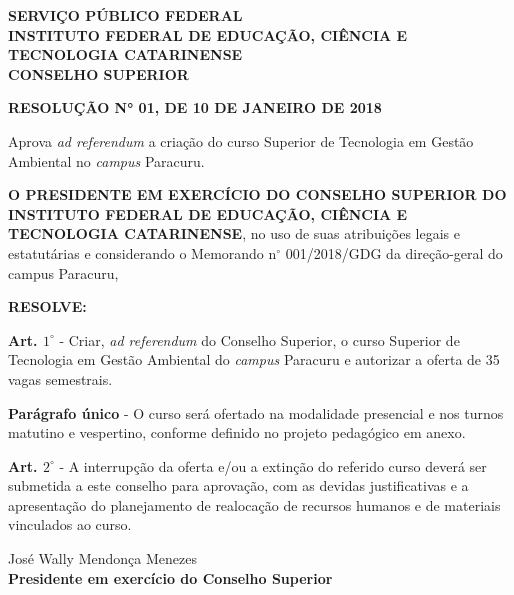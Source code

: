 
\begin{center}
\begin{figure}[!ht]
\centering
\end{figure}
\vspace*{-0.8cm}
\textbf{
SERVIÇO PÚBLICO FEDERAL \\
INSTITUTO FEDERAL DE EDUCAÇÃO, CIÊNCIA E TECNOLOGIA CATARINENSE \\
CONSELHO SUPERIOR
}
\end{center}

\begin{center}
\textbf{RESOLUÇÃO N° 01, DE 10 DE JANEIRO DE 2018}
\end{center}

\vspace*{-1cm}

\begin{SingleSpace}
\begin{flushright}
\begin{minipage}[b]{8cm}
\begin{small}
Aprova \textit{ad referendum} a criação do curso Superior de Tecnologia em Gestão Ambiental no \textit{campus} Paracuru. 
\end{small}
\end{minipage}
\end{flushright}
\end{SingleSpace}

\textbf{O PRESIDENTE EM EXERCÍCIO DO CONSELHO SUPERIOR DO INSTITUTO FEDERAL DE EDUCAÇÃO, CIÊNCIA E TECNOLOGIA CATARINENSE}, no uso de suas atribuições legais e estatutárias e considerando o Memorando n$^{\circ}$ 001/2018/GDG da direção-geral do campus Paracuru, 

\textbf{RESOLVE:}

\textbf{Art. $1^{\circ}$} - Criar, \textit{ad referendum} do Conselho Superior, o curso Superior de Tecnologia em Gestão Ambiental do \textit{campus} Paracuru e autorizar a oferta de 35 vagas semestrais.

\textbf{Parágrafo único} - O curso será ofertado na modalidade presencial e nos turnos matutino e vespertino, conforme definido no projeto pedagógico em anexo. 

\textbf{Art. $2^{\circ}$} - A interrupção da oferta e/ou a extinção do referido curso deverá ser submetida a este conselho para aprovação, com as devidas justificativas e a apresentação do planejamento de realocação de recursos humanos e de materiais vinculados ao curso.

\begin{center}
José Wally Mendonça Menezes \\
\textbf{Presidente em exercício do Conselho Superior}
\end{center}